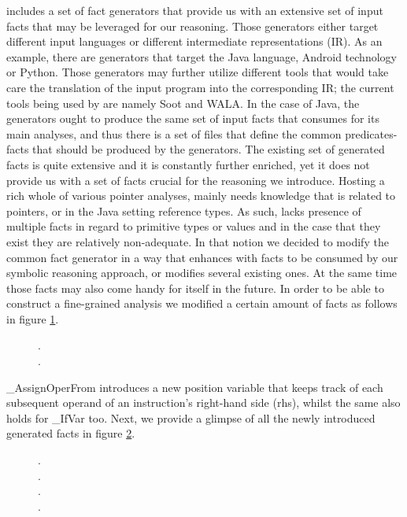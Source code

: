 \doop{} includes a set of fact generators that provide us with an
extensive set of input facts that may be leveraged for our reasoning.
Those generators either target different input languages or different
intermediate representations (IR). As an example, there are generators
that target the Java language, Android technology or Python. Those
generators may further utilize different tools that would take care
the translation of the input program into the corresponding IR; the
current tools being used by \doop{} are namely Soot and WALA. In the case of
Java, the generators ought to produce the same set of input facts
that \doop{} consumes for its main analyses, and thus there is a set
of files that define the common predicates-facts that should be
produced by the generators. The existing set of generated
facts is quite extensive and it is constantly further enriched, yet it
does not provide us with a set of facts crucial for the reasoning
we introduce. Hosting a rich whole of various pointer analyses,
\doop{} mainly needs knowledge that is related to pointers, or
in the Java setting reference types. As such, \doop{} lacks
presence of multiple facts in regard to primitive types or
values and in the case that they exist they are relatively
non-adequate. In that notion we decided to modify the common fact
generator in a way that enhances \doop{} with facts to be consumed
by our symbolic reasoning approach, or modifies several existing ones.
At the same time those facts may also come handy for \doop{} itself
in the future. In order to be able to construct a fine-grained
analysis we modified a certain amount of facts as follows in figure \ref{fig:facts-modified}.

\begin{figure}[th]
.\\
.
\label{fig:facts-modified}
\end{figure}

\_AssignOperFrom introduces a new position variable that keeps track of
each subsequent operand of an instruction's right-hand side (rhs), whilst
the same also holds for \_IfVar too. Next, we provide a glimpse of all the
newly introduced generated facts in figure \ref{fig:facts-new}.

\begin{figure}[th]
  .\\
  .\\
  .\\
  .
  \label{fig:facts-new}
\end{figure}

